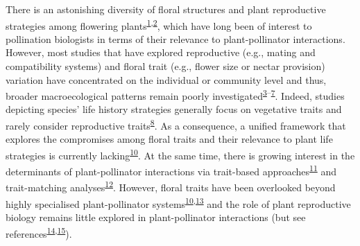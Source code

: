\documentclass[12pt,a4paper,]{article}
\begin{document}
\doublespacing
\vspace{5mm} \normalsize

There is an astonishing diversity of floral structures and plant
reproductive strategies among flowering
plants\textsuperscript{\protect\hyperlink{ref-barrett2002}{1},\protect\hyperlink{ref-schiestl2013}{2}},
which have long been of interest to pollination biologists in terms of
their relevance to plant-pollinator interactions. However, most studies
that have explored reproductive (e.g., mating and compatibility systems)
and floral trait (e.g., flower size or nectar provision) variation have
concentrated on the individual or community level and thus, broader
macroecological patterns remain poorly
investigated\textsuperscript{\protect\hyperlink{ref-carvalheiro2014}{3}--\protect\hyperlink{ref-grossenbacher2017}{7}}.
Indeed, studies depicting species' life history strategies generally
focus on vegetative traits and rarely consider reproductive
traits\textsuperscript{\protect\hyperlink{ref-salguero2016}{8}}. As a
consequence, a unified framework that explores the compromises among
floral traits and their relevance to plant life strategies is currently
lacking\textsuperscript{\protect\hyperlink{ref-roddy2021}{10}}. At the
same time, there is growing interest in the determinants of
plant-pollinator interactions via trait-based
approaches\textsuperscript{\protect\hyperlink{ref-fenster2004}{11}} and
trait-matching
analyses\textsuperscript{\protect\hyperlink{ref-bartomeus2016}{12}}.
However, floral traits have been overlooked beyond highly specialised
plant-pollinator
systems\textsuperscript{\protect\hyperlink{ref-roddy2021}{10},\protect\hyperlink{ref-dellinger2020}{13}}
and the role of plant reproductive biology remains little explored in
plant-pollinator interactions (but see
references\textsuperscript{\protect\hyperlink{ref-tur2013}{14},\protect\hyperlink{ref-devaux2014}{15}}).
\end{document}
